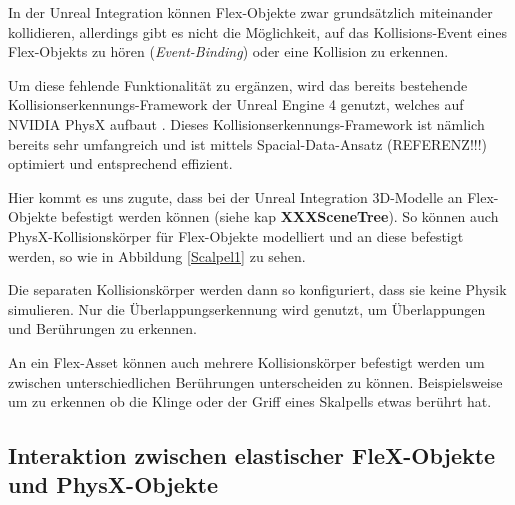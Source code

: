 In der Unreal Integration können Flex-Objekte zwar grundsätzlich miteinander kollidieren, allerdings gibt es nicht die Möglichkeit, auf das Kollisions-Event eines Flex-Objekts zu hören (\textit{Event-Binding}) oder eine Kollision zu erkennen.

Um diese fehlende Funktionalität zu ergänzen, wird das bereits bestehende Kollisionserkennungs-Framework der Unreal Engine 4 genutzt, welches auf NVIDIA PhysX aufbaut \cite{ue4physics}. Dieses Kollisionserkennungs-Framework ist nämlich bereits sehr umfangreich und ist mittels Spacial-Data-Ansatz (REFERENZ!!!) optimiert und entsprechend effizient.


Hier kommt es uns zugute, dass bei der Unreal Integration 3D-Modelle an Flex-Objekte befestigt werden können (siehe kap \textbf{XXXSceneTree}). So können auch PhysX-Kollisionskörper für Flex-Objekte modelliert und an diese befestigt werden, so wie in Abbildung \ref{Scalpel1} zu sehen.


Die separaten Kollisionskörper werden dann so konfiguriert, dass sie keine Physik simulieren. Nur die Überlappungserkennung wird genutzt, um Überlappungen und Berührungen zu erkennen.

An ein Flex-Asset können auch mehrere Kollisionskörper befestigt werden um zwischen unterschiedlichen Berührungen unterscheiden zu können. Beispielsweise um zu erkennen ob die Klinge oder der Griff eines Skalpells etwas berührt hat.


  
\subsection{Interaktion zwischen elastischer FleX-Objekte und PhysX-Objekte}


